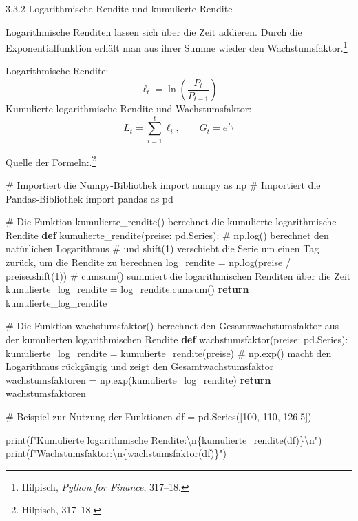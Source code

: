\documentclass[
  ngerman,
  a4paper,
  DIV=11,
  oneside]{scrreprt}
\newenvironment{Shaded}{\begin{snugshade}}{\end{snugshade}}
\newcommand{\BuiltInTok}[1]{\textcolor[rgb]{0.00,0.23,0.31}{#1}}
\newcommand{\CharTok}[1]{\textcolor[rgb]{0.13,0.47,0.30}{#1}}
\newcommand{\CommentTok}[1]{\textcolor[rgb]{0.37,0.37,0.37}{#1}}
\newcommand{\ControlFlowTok}[1]{\textcolor[rgb]{0.00,0.23,0.31}{\textbf{#1}}}
\newcommand{\DecValTok}[1]{\textcolor[rgb]{0.68,0.00,0.00}{#1}}
\newcommand{\FloatTok}[1]{\textcolor[rgb]{0.68,0.00,0.00}{#1}}
\newcommand{\ImportTok}[1]{\textcolor[rgb]{0.00,0.46,0.62}{#1}}
\newcommand{\KeywordTok}[1]{\textcolor[rgb]{0.00,0.23,0.31}{\textbf{#1}}}
\newcommand{\NormalTok}[1]{\textcolor[rgb]{0.00,0.23,0.31}{#1}}
\newcommand{\OperatorTok}[1]{\textcolor[rgb]{0.37,0.37,0.37}{#1}}
\newcommand{\SpecialCharTok}[1]{\textcolor[rgb]{0.37,0.37,0.37}{#1}}
\newcommand{\SpecialStringTok}[1]{\textcolor[rgb]{0.13,0.47,0.30}{#1}}
\begin{document}
3.3.2 Logarithmische Rendite und kumulierte Rendite

Logarithmische Renditen lassen sich über die Zeit addieren. Durch die
Exponentialfunktion erhält man aus ihrer Summe wieder den
Wachstumsfaktor.\footnote{Hilpisch, \emph{Python for Finance}, 317--18.}

Logarithmische Rendite: \[
\ell_t=\ln\left(\frac{P_t}{P_{t-1}}\right)
\] Kumulierte logarithmische Rendite und Wachstumsfaktor: \[
L_t=\sum_{i=1}^{t}\ell_i,\qquad G_t=e^{L_t}
\]

Quelle der Formeln:.\footnote{Hilpisch, 317--18.}

\begin{Shaded}
\begin{Highlighting}[]
\CommentTok{\# Importiert die Numpy{-}Bibliothek}
\ImportTok{import}\NormalTok{ numpy }\ImportTok{as}\NormalTok{ np}
\CommentTok{\# Importiert die Pandas{-}Bibliothek}
\ImportTok{import}\NormalTok{ pandas }\ImportTok{as}\NormalTok{ pd}

\CommentTok{\# Die Funktion kumulierte\_rendite() berechnet die kumulierte logarithmische Rendite}
\KeywordTok{def}\NormalTok{ kumulierte\_rendite(preise: pd.Series):}
    \CommentTok{\# np.log() berechnet den natürlichen Logarithmus}
    \CommentTok{\# und shift(1) verschiebt die Serie um einen Tag zurück, um die Rendite zu berechnen}
\NormalTok{    log\_rendite }\OperatorTok{=}\NormalTok{ np.log(preise }\OperatorTok{/}\NormalTok{ preise.shift(}\DecValTok{1}\NormalTok{))}
    \CommentTok{\# cumsum() summiert die logarithmischen Renditen über die Zeit}
\NormalTok{    kumulierte\_log\_rendite }\OperatorTok{=}\NormalTok{ log\_rendite.cumsum()}
    \ControlFlowTok{return}\NormalTok{ kumulierte\_log\_rendite}

\CommentTok{\# Die Funktion wachstumsfaktor() berechnet den Gesamtwachstumsfaktor aus der kumulierten logarithmischen Rendite}
\KeywordTok{def}\NormalTok{ wachstumsfaktor(preise: pd.Series):}
\NormalTok{    kumulierte\_log\_rendite }\OperatorTok{=}\NormalTok{ kumulierte\_rendite(preise)}
    \CommentTok{\# np.exp() macht den Logarithmus rückgängig und zeigt den Gesamtwachstumsfaktor}
\NormalTok{    wachstumsfaktoren }\OperatorTok{=}\NormalTok{ np.exp(kumulierte\_log\_rendite)}
    \ControlFlowTok{return}\NormalTok{ wachstumsfaktoren}


\CommentTok{\# Beispiel zur Nutzung der Funktionen}
\NormalTok{df }\OperatorTok{=}\NormalTok{ pd.Series([}\DecValTok{100}\NormalTok{, }\DecValTok{110}\NormalTok{, }\FloatTok{126.5}\NormalTok{])}

\BuiltInTok{print}\NormalTok{(}\SpecialStringTok{f"Kumulierte logarithmische Rendite:}\CharTok{\textbackslash{}n}\SpecialCharTok{\{}\NormalTok{kumulierte\_rendite(df)}\SpecialCharTok{\}}\CharTok{\textbackslash{}n}\SpecialStringTok{"}\NormalTok{)}
\BuiltInTok{print}\NormalTok{(}\SpecialStringTok{f"Wachstumsfaktor:}\CharTok{\textbackslash{}n}\SpecialCharTok{\{}\NormalTok{wachstumsfaktor(df)}\SpecialCharTok{\}}\SpecialStringTok{"}\NormalTok{)}
\end{Highlighting}
\end{Shaded}
\end{document}
